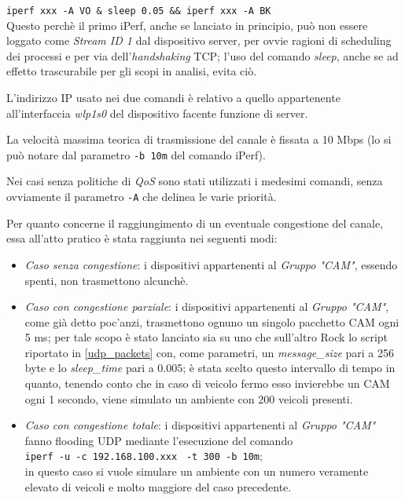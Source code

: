 \verb|iperf xxx -A VO & sleep 0.05 && iperf xxx -A BK| \\
\noindent Questo perchè il primo iPerf, anche se lanciato in principio, può non essere loggato come \textit{Stream ID 1} dal dispositivo server, per ovvie ragioni di scheduling dei processi e per via dell'\textit{handshaking} TCP; l'uso del comando \textit{sleep}, anche se ad effetto trascurabile per gli scopi in analisi, evita ciò.

L'indirizzo IP usato nei due comandi è relativo a quello appartenente all'interfaccia \textit{wlp1s0} del dispositivo facente funzione di server.

La velocità massima teorica di trasmissione del canale è fissata a 10 Mbps (lo si può notare dal parametro \verb|-b 10m| del comando iPerf).

Nei casi senza politiche di \textit{QoS} sono stati utilizzati i medesimi comandi, senza ovviamente il parametro \verb|-A| che delinea le varie priorità.

Per quanto concerne il raggiungimento di un eventuale congestione del canale, essa all'atto pratico è stata raggiunta nei seguenti modi:

\begin{itemize}
    \item \textit{Caso senza congestione}: i dispositivi appartenenti al \textit{Gruppo "CAM"}, essendo spenti, non trasmettono alcunchè.
    \item \textit{Caso con congestione parziale}: i dispositivi appartenenti al \textit{Gruppo "CAM"}, come già detto poc'anzi, trasmettono ognuno un singolo pacchetto CAM ogni 5 ms; per tale scopo è stato lanciato sia su uno che sull'altro Rock lo script riportato in \autoref{udp_packets} con, come parametri, un \textit{message\_size} pari a 256 byte e lo \textit{sleep\_time} pari a 0.005; è stata scelto questo intervallo di tempo in quanto, tenendo conto che in caso di veicolo fermo esso invierebbe un CAM ogni 1 secondo, viene simulato un ambiente con 200 veicoli presenti.
    \item \textit{Caso con congestione totale}: i dispositivi appartenenti al \textit{Gruppo "CAM"} fanno flooding UDP mediante l'esecuzione del comando \\\verb|iperf -u -c 192.168.100.xxx| \verb| -t 300 -b 10m|;\\ in questo caso si vuole simulare un ambiente con un numero veramente elevato di veicoli e molto maggiore del caso precedente.
\end{itemize}

